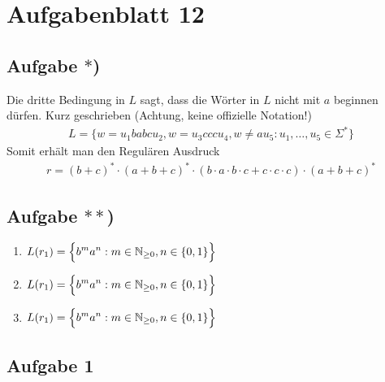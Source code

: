 
\section{Aufgabenblatt 12}
\subsection*{Aufgabe $\ast$)}
Die dritte Bedingung in $L$ sagt, dass die Wörter in $L$ nicht mit $a$ beginnen dürfen.
Kurz geschrieben (Achtung, keine offizielle Notation!)
\begin{align*}
	L=\Big\lbrace w=u_1 babc u_2,w=u_3 ccc u_4,w\neq a u_5:u_1,\ldots,u_5\in\Sigma^\ast\Big\rbrace
\end{align*}
Somit erhält man den Regulären Ausdruck 
\begin{align*}
	r=(b+c)^\ast\cdot(a+b+c)^\ast\cdot(b\cdot a\cdot b\cdot c+c\cdot c\cdot c)\cdot(a+b+c)^\ast
\end{align*}

\subsection*{Aufgabe $\ast\ast$)}
\begin{enumerate}[label=(\alph*)]
	\item $\begin{aligned}
		L(r_1)=\Big\lbrace b^m a^n:m\in\mathbb{N}_{\geq0},n\in\lbrace0,1\rbrace\Big\rbrace
	\end{aligned}$
	\item $\begin{aligned}
		L(r_1)=\Big\lbrace b^m a^n:m\in\mathbb{N}_{\geq0},n\in\lbrace0,1\rbrace\Big\rbrace
	\end{aligned}$
	\item $\begin{aligned}
		L(r_1)=\Big\lbrace b^m a^n:m\in\mathbb{N}_{\geq0},n\in\lbrace0,1\rbrace\Big\rbrace
	\end{aligned}$
\end{enumerate}

\subsection{Aufgabe 1}

